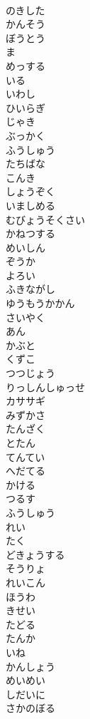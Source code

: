\documentclass[8pt]{extreport}
\begin{document}
\begin{CJK}{UTF8}{min}
\\	のきした
\\	かんそう
\\	ぼうとう
\\	ま
\\	めっする
\\	いる
\\	いわし
\\	ひいらぎ
\\	じゃき
\\	ぶっかく
\\	ふうしゅう
\\	たちばな
\\	こんき
\\	しょうぞく
\\	いましめる
\\	むびょうそくさい
\\	かねつする
\\	めいしん
\\	ぞうか
\\	よろい
\\	ふきながし
\\	ゆうもうかかん
\\	さいやく
\\	あん
\\	かぶと
\\	くずこ
\\	つつじょう
\\	りっしんしゅっせ
\\	カササギ
\\	みずかさ
\\	たんざく
\\	とたん
\\	てんてい
\\	へだてる
\\	かける
\\	つるす
\\	ふうしゅう
\\	れい
\\	たく
\\	どきょうする
\\	そうりょ
\\	れいこん
\\	ほうわ
\\	きせい
\\	たどる
\\	たんか
\\	いね
\\	かんしょう
\\	めいめい
\\	しだいに
\\	さかのぼる

\end{CJK}
\end{document}
